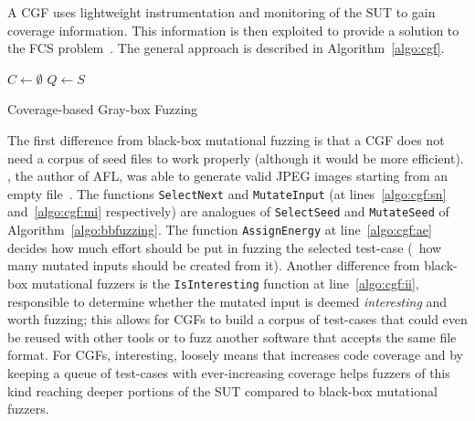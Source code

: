A \ac{CGF} uses lightweight instrumentation and monitoring of the \ac{SUT} to
gain coverage information. This information is then exploited to provide a
solution to the \ac{FCS}
problem~\cite{afltech,lemieux2017fairfuzz,bohme2017directed,bohme2017coverage}.
The general approach is described in Algorithm~\ref{algo:cgf}.

\begin{algorithm}
    \DontPrintSemicolon%
    \BlankLine%
    $C \leftarrow \emptyset$\;
    $Q \leftarrow S$\;
    \caption{Coverage-based Gray-box Fuzzing}
\label{algo:cgf}
\end{algorithm}

The first difference from black-box mutational fuzzing is that a \ac{CGF} does
not need a corpus of seed files to work properly (although it would be more
efficient). \citeauthor{afl}, the author of AFL, was able to generate valid JPEG
images starting from an empty file~\cite{afljpeg}. The functions
\texttt{SelectNext} and \texttt{MutateInput} (at lines~\ref{algo:cgf:sn}
and~\ref{algo:cgf:mi} respectively) are analogues of \texttt{SelectSeed} and
\texttt{MutateSeed} of Algorithm~\ref{algo:bbfuzzing}. The function
\texttt{AssignEnergy} at line~\ref{algo:cgf:ae} decides how much effort should
be put in fuzzing the selected test-case (\eg~how many mutated inputs should be
created from it). Another difference from black-box mutational fuzzers is the
\texttt{IsInteresting} function at line~\ref{algo:cgf:ii}, responsible to
determine whether the mutated input is deemed \emph{interesting} and worth
fuzzing; this allows for \acp{CGF} to build a corpus of test-cases that could
even be reused with other tools or to fuzz another software that accepts the
same file format. For \acp{CGF}, interesting, loosely means that increases code
coverage and by keeping a queue of test-cases with ever-increasing coverage
helps fuzzers of this kind reaching deeper portions of the \ac{SUT} compared to
black-box mutational fuzzers.

